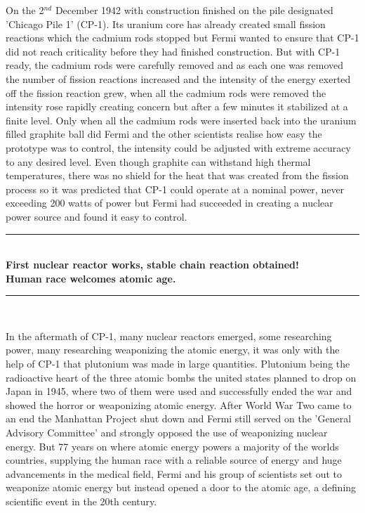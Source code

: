 \documentclass[11pt]{article}
\begin{document}
\begin{multicols}{2}
\noindent On the 2$^{nd}$ December 1942 with construction finished on the pile designated 'Chicago Pile 1' (CP-1). Its uranium core has already created small fission reactions which the cadmium rods stopped but Fermi wanted to ensure that CP-1 did not reach criticality before they had finished construction. But with CP-1 ready, the cadmium rods were carefully removed and as each one was removed the number of fission reactions increased and the intensity of the energy exerted off the fission reaction grew, when all the cadmium rods were removed the intensity rose rapidly creating concern but after a few minutes it stabilized at a finite level. Only when all the cadmium rods were inserted back into the uranium filled graphite ball did Fermi and the other scientists realise how easy the prototype was to control, the intensity could be adjusted with extreme accuracy to any desired level. Even though graphite can withstand high thermal temperatures, there was no shield for the heat that was created from the fission process so it was predicted that CP-1 could operate at a nominal power, never exceeding 200 watts of power but Fermi had succeeded in creating a nuclear power source and found it easy to control. \\ [-1.0cm]

\begin{center}
    \rule{9cm}{0.05cm} \\ [0.2cm]
    \textbf{\Large{First nuclear reactor works, stable chain reaction obtained!}} \\
    \textbf{Human race welcomes atomic age.} \\
    \rule{9cm}{0.1cm}\\ [-0.1cm]
\end{center} 
\vspace{-0.2cm}

\noindent In the aftermath of CP-1, many nuclear reactors emerged, some researching power, many researching weaponizing the atomic energy, it was only with the help of CP-1 that plutonium was made in large quantities. Plutonium being the radioactive heart of the three atomic bombs the united states planned to drop on Japan in 1945, where two of them were used and successfully ended the war and showed the horror or weaponizing atomic energy. After World War Two came to an end the Manhattan Project shut down and Fermi still served on the 'General Advisory Committee' and strongly opposed the use of weaponizing nuclear energy. But 77 years on where atomic energy powers a majority of the worlds countries, supplying the human race with a reliable source of energy and huge advancements in the medical field, Fermi and his group of scientists set out to weaponize atomic energy but instead opened a door to the atomic age, a defining scientific event in the 20th century.  

\end{multicols}
\newpage


\end{document}
